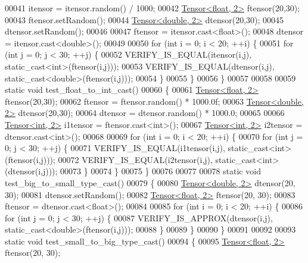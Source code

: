 \begin{DoxyCode}
00041   itensor = itensor.random() / 1000;
00042   \hyperlink{class_eigen_1_1_tensor}{Tensor<float, 2>} ftensor(20,30);
00043   ftensor.setRandom();
00044   \hyperlink{class_eigen_1_1_tensor}{Tensor<double, 2>} dtensor(20,30);
00045   dtensor.setRandom();
00046 
00047   ftensor = itensor.cast<\textcolor{keywordtype}{float}>();
00048   dtensor = itensor.cast<\textcolor{keywordtype}{double}>();
00049 
00050   \textcolor{keywordflow}{for} (\textcolor{keywordtype}{int} i = 0; i < 20; ++i) \{
00051     \textcolor{keywordflow}{for} (\textcolor{keywordtype}{int} j = 0; j < 30; ++j) \{
00052       VERIFY\_IS\_EQUAL(itensor(i,j), static\_cast<int>(ftensor(i,j)));
00053       VERIFY\_IS\_EQUAL(dtensor(i,j), static\_cast<double>(ftensor(i,j)));
00054     \}
00055   \}
00056 \}
00057 
00058 
00059 \textcolor{keyword}{static} \textcolor{keywordtype}{void} test\_float\_to\_int\_cast()
00060 \{
00061   \hyperlink{class_eigen_1_1_tensor}{Tensor<float, 2>} ftensor(20,30);
00062   ftensor = ftensor.random() * 1000.0f;
00063   \hyperlink{class_eigen_1_1_tensor}{Tensor<double, 2>} dtensor(20,30);
00064   dtensor = dtensor.random() * 1000.0;
00065 
00066   \hyperlink{class_eigen_1_1_tensor}{Tensor<int, 2>} i1tensor = ftensor.cast<\textcolor{keywordtype}{int}>();
00067   \hyperlink{class_eigen_1_1_tensor}{Tensor<int, 2>} i2tensor = dtensor.cast<\textcolor{keywordtype}{int}>();
00068 
00069   \textcolor{keywordflow}{for} (\textcolor{keywordtype}{int} i = 0; i < 20; ++i) \{
00070     \textcolor{keywordflow}{for} (\textcolor{keywordtype}{int} j = 0; j < 30; ++j) \{
00071       VERIFY\_IS\_EQUAL(i1tensor(i,j), static\_cast<int>(ftensor(i,j)));
00072       VERIFY\_IS\_EQUAL(i2tensor(i,j), static\_cast<int>(dtensor(i,j)));
00073     \}
00074   \}
00075 \}
00076 
00077 
00078 \textcolor{keyword}{static} \textcolor{keywordtype}{void} test\_big\_to\_small\_type\_cast()
00079 \{
00080   \hyperlink{class_eigen_1_1_tensor}{Tensor<double, 2>} dtensor(20, 30);
00081   dtensor.setRandom();
00082   \hyperlink{class_eigen_1_1_tensor}{Tensor<float, 2>} ftensor(20, 30);
00083   ftensor = dtensor.cast<\textcolor{keywordtype}{float}>();
00084 
00085   \textcolor{keywordflow}{for} (\textcolor{keywordtype}{int} i = 0; i < 20; ++i) \{
00086     \textcolor{keywordflow}{for} (\textcolor{keywordtype}{int} j = 0; j < 30; ++j) \{
00087       VERIFY\_IS\_APPROX(dtensor(i,j), static\_cast<double>(ftensor(i,j)));
00088     \}
00089   \}
00090 \}
00091 
00092 
00093 \textcolor{keyword}{static} \textcolor{keywordtype}{void} test\_small\_to\_big\_type\_cast()
00094 \{
00095   \hyperlink{class_eigen_1_1_tensor}{Tensor<float, 2>} ftensor(20, 30);

\end{DoxyCode}
